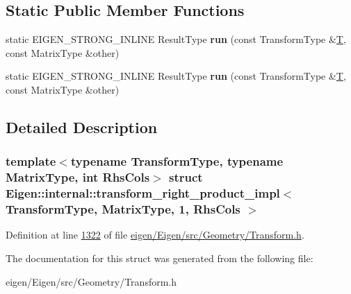 \subsection*{Static Public Member Functions}
\begin{DoxyCompactItemize}
\item 
\mbox{\label{struct_eigen_1_1internal_1_1transform__right__product__impl_3_01_transform_type_00_01_matrix_type_00_011_00_01_rhs_cols_01_4_ade517193be757295c56845061de342fe}} 
static E\+I\+G\+E\+N\+\_\+\+S\+T\+R\+O\+N\+G\+\_\+\+I\+N\+L\+I\+NE Result\+Type {\bfseries run} (const Transform\+Type \&\hyperlink{group___sparse_core___module}{T}, const Matrix\+Type \&other)
\item 
\mbox{\label{struct_eigen_1_1internal_1_1transform__right__product__impl_3_01_transform_type_00_01_matrix_type_00_011_00_01_rhs_cols_01_4_ade517193be757295c56845061de342fe}} 
static E\+I\+G\+E\+N\+\_\+\+S\+T\+R\+O\+N\+G\+\_\+\+I\+N\+L\+I\+NE Result\+Type {\bfseries run} (const Transform\+Type \&\hyperlink{group___sparse_core___module}{T}, const Matrix\+Type \&other)
\end{DoxyCompactItemize}


\subsection{Detailed Description}
\subsubsection*{template$<$typename Transform\+Type, typename Matrix\+Type, int Rhs\+Cols$>$\newline
struct Eigen\+::internal\+::transform\+\_\+right\+\_\+product\+\_\+impl$<$ Transform\+Type, Matrix\+Type, 1, Rhs\+Cols $>$}



Definition at line \hyperlink{eigen_2_eigen_2src_2_geometry_2_transform_8h_source_l01322}{1322} of file \hyperlink{eigen_2_eigen_2src_2_geometry_2_transform_8h_source}{eigen/\+Eigen/src/\+Geometry/\+Transform.\+h}.



The documentation for this struct was generated from the following file\+:\begin{DoxyCompactItemize}
\item 
eigen/\+Eigen/src/\+Geometry/\+Transform.\+h\end{DoxyCompactItemize}
